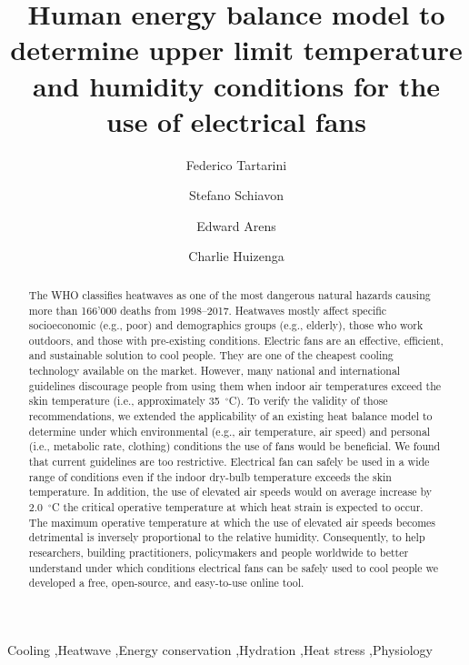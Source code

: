
\begin{frontmatter}

\title{Human energy balance model to determine upper limit temperature and humidity conditions for the use of electrical fans}

\author[sinBerBest]{Federico Tartarini}
\author[CBE]{Stefano Schiavon}
\author[CBE]{Edward Arens}
\author[CBE]{Charlie Huizenga}

\address[sinBerBest]{SinBerBEST, Berkeley Education Alliance for Research in Singapore, Singapore}
\address[CBE]{Center for the Built Environment, University of California, Berkeley, USA}

\begin{abstract}
    The WHO classifies heatwaves as one of the most dangerous natural hazards causing more than 166'000 deaths from 1998--2017.
    Heatwaves mostly affect specific socioeconomic (e.g., poor) and demographics groups (e.g., elderly), those who work outdoors, and those with pre-existing conditions.
    Electric fans are an effective, efficient, and sustainable solution to cool people.
    They are one of the cheapest cooling technology available on the market.
    However, many national and international guidelines discourage people from using them when indoor air temperatures exceed the skin temperature (i.e., approximately 35~$^{\circ}$C\@).
    To verify the validity of those recommendations, we extended the applicability of an existing heat balance model to determine under which environmental (e.g., air temperature, air speed) and personal (i.e., metabolic rate, clothing) conditions the use of fans would be beneficial.
    We found that current guidelines are too restrictive.
    Electrical fan can safely be used in a wide range of conditions even if the indoor dry-bulb temperature exceeds the skin temperature.
    In addition, the use of elevated air speeds would on average increase by 2.0~$^{\circ}$C the critical operative temperature at which heat strain is expected to occur.
    The maximum operative temperature at which the use of elevated air speeds becomes detrimental is inversely proportional to the relative humidity.
    Consequently, to help researchers, building practitioners, policymakers and people worldwide to better understand under which conditions electrical fans can be safely used to cool people we developed a free, open-source, and easy-to-use online tool.
\end{abstract}

\begin{keyword}
Cooling \sep Heatwave \sep Energy conservation \sep Hydration \sep Heat stress \sep Physiology
\end{keyword}

\end{frontmatter}
